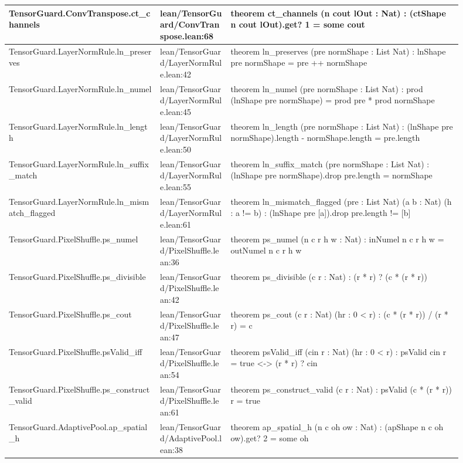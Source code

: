 \documentclass[10pt]{article}
\begin{document}
\begin{longtable}{|p{0.30\linewidth}|p{0.14\linewidth}|p{0.46\linewidth}|}
\hline
TensorGuard.ConvTranspose.ct\_channels & lean/TensorGuard/ConvTranspose.lean:68 & theorem ct\_channels (n cout lOut : Nat) : (ctShape n cout lOut).get? 1 = some cout \\
\hline
TensorGuard.LayerNormRule.ln\_preserves & lean/TensorGuard/LayerNormRule.lean:42 & theorem ln\_preserves (pre normShape : List Nat) : lnShape pre normShape = pre ++ normShape \\
\hline
TensorGuard.LayerNormRule.ln\_numel & lean/TensorGuard/LayerNormRule.lean:45 & theorem ln\_numel (pre normShape : List Nat) : prod (lnShape pre normShape) = prod pre * prod normShape \\
\hline
TensorGuard.LayerNormRule.ln\_length & lean/TensorGuard/LayerNormRule.lean:50 & theorem ln\_length (pre normShape : List Nat) : (lnShape pre normShape).length - normShape.length = pre.length \\
\hline
TensorGuard.LayerNormRule.ln\_suffix\_match & lean/TensorGuard/LayerNormRule.lean:55 & theorem ln\_suffix\_match (pre normShape : List Nat) : (lnShape pre normShape).drop pre.length = normShape \\
\hline
TensorGuard.LayerNormRule.ln\_mismatch\_flagged & lean/TensorGuard/LayerNormRule.lean:61 & theorem ln\_mismatch\_flagged (pre : List Nat) (a b : Nat) (h : a != b) : (lnShape pre [a]).drop pre.length != [b] \\
\hline
TensorGuard.PixelShuffle.ps\_numel & lean/TensorGuard/PixelShuffle.lean:36 & theorem ps\_numel (n c r h w : Nat) : inNumel n c r h w = outNumel n c r h w \\
\hline
TensorGuard.PixelShuffle.ps\_divisible & lean/TensorGuard/PixelShuffle.lean:42 & theorem ps\_divisible (c r : Nat) : (r * r) ? (c * (r * r)) \\
\hline
TensorGuard.PixelShuffle.ps\_cout & lean/TensorGuard/PixelShuffle.lean:47 & theorem ps\_cout (c r : Nat) (hr : 0 < r) : (c * (r * r)) / (r * r) = c \\
\hline
TensorGuard.PixelShuffle.psValid\_iff & lean/TensorGuard/PixelShuffle.lean:54 & theorem psValid\_iff (cin r : Nat) (hr : 0 < r) : psValid cin r = true <-> (r * r) ? cin \\
\hline
TensorGuard.PixelShuffle.ps\_construct\_valid & lean/TensorGuard/PixelShuffle.lean:61 & theorem ps\_construct\_valid (c r : Nat) : psValid (c * (r * r)) r = true \\
\hline
TensorGuard.AdaptivePool.ap\_spatial\_h & lean/TensorGuard/AdaptivePool.lean:38 & theorem ap\_spatial\_h (n c oh ow : Nat) : (apShape n c oh ow).get? 2 = some oh \\

\end{longtable}
\end{document}
